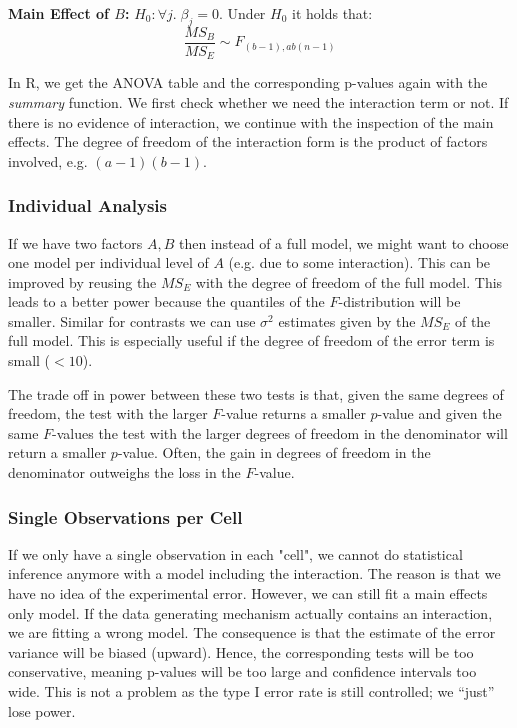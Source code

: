\textbf{Main Effect of $B$:} $H_0: \forall j. \; \beta_j = 0$. Under $H_0$ it holds that:
$$\frac{MS_{B}}{MS_E} \sim F_{(b-1), ab(n-1)}$$

In R, we get the ANOVA table and the corresponding p-values again with the \textit{summary} function. We first check whether we need the interaction term or not. If there is no evidence of interaction, we continue with the inspection of the main effects. The degree of freedom of the interaction form is the product of factors involved, e.g. $(a-1)(b-1)$.

\subsubsection{Individual Analysis}

If we have two factors $A, B$ then instead of a full model, we might want to choose one model per individual level of $A$ (e.g. due to some interaction). This can be improved by reusing the $MS_E$ with the degree of freedom of the full model. This leads to a better power because the quantiles of the $F$-distribution will be smaller. Similar for contrasts we can use $\sigma^2$ estimates given by the $MS_E$ of the full model. This is especially useful if the degree of freedom of the error term is small ($< 10$). \medskip

The trade off in power between these two tests is that, given the same degrees of freedom, the test with the larger $F$-value returns a smaller $p$-value and given the same $F$-values the test with the larger degrees of freedom in the denominator will return a smaller $p$-value. Often, the gain in degrees of freedom in the denominator outweighs the loss in the $F$-value.

\subsubsection{Single Observations per Cell}

If we only have a single observation in each "cell", we cannot do statistical inference anymore with a model including the interaction. The reason is that we have no idea of the experimental error. However, we can still fit a main effects only model. If the data generating mechanism actually contains an interaction, we are fitting a wrong model. The consequence is that the estimate of the error variance will be biased (upward). Hence, the corresponding tests will be too conservative, meaning p-values will be too large and confidence intervals too wide. This is not a problem as the type I error rate is still controlled; we “just” lose power. \medskip

